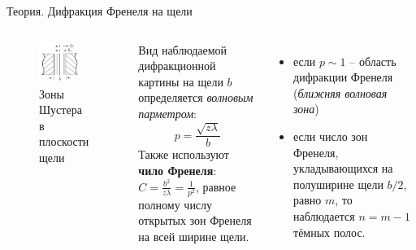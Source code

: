 \documentclass[11pt]{beamer} %
\begin{document}
    \begin{frame}{Теория. Дифракция Френеля на щели}
        \begin{columns}
            \begin{figure}[H]
                \centering
                \includegraphics[width = 0.8\textwidth]{images/theory_1t_exp.jpg}
                \caption{Зоны Шустера в плоскости щели}
            \end{figure}
            
                Вид наблюдаемой дифракционной картины на щели $b$ определяется \textit{волновым парметром}:
                \begin{equation}
                    p = \frac{\sqrt{z\lambda}}{b}
                \end{equation}
                Также используют \textbf{чило Френеля}: $C = \frac{b^2}{z\lambda} = \frac{1}{p^2}$, равное полному числу открытых зон Френеля на всей ширине щели.\\
                \begin{itemize}
                    \item если $p \sim 1$ -- область дифракции Френеля (\textit{ближняя волновая зона})
                    \item если число зон Френеля, укладывающихся на полуширине щели $b/2$, равно $m$, то наблюдается $n = m - 1$ тёмных полос.
                \end{itemize}
        \end{columns}
    \end{frame}
\end{document}
